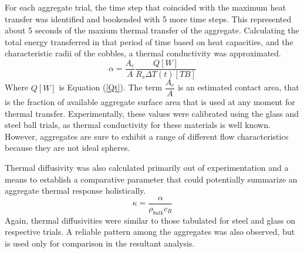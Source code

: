 For each aggregate trial, the time step that coincided with the maximum heat transfer was identified and bookended with 5 more time steps. This represented about 5 seconds of the maxium thermal transfer of the aggregate. Calculating the total energy transferred in that period of time based on heat capacities, and the characteristic radii of the cobbles, a thermal conductivity was approximated.
\begin{equation}\label{k}
\alpha=\frac{A_{c}}{A}\frac{Q[W]}{R_{s}\Delta T(t)[TB]} 
\end{equation}
Where $Q[W]$ is Equation (\ref{Qt}). The term $\dfrac{A_{c}}{A}$ is an estimated contact area, that is the fraction of available aggregate surface area that is used at any moment for thermal transfer. Experimentally, these values were calibrated using the glass and steel ball trials, as thermal conductivity for these materials is well known. However, aggregates are sure to exhibit a range of different flow characteristics because they are not ideal spheres. 

Thermal diffusivity was also calculated primarily out of experimentation and a means to establish a comparative parameter that could potentially summarize an aggregate thermal response holistically.
\begin{equation}
 \kappa=\frac{\alpha}{\rho_{bulk}c_{R}}
\end{equation}
Again, thermal diffusivities were similar to those tabulated for steel and glass on respective trials. A reliable pattern among the aggregates was also observed, but is used only for comparison in the resultant analysis.